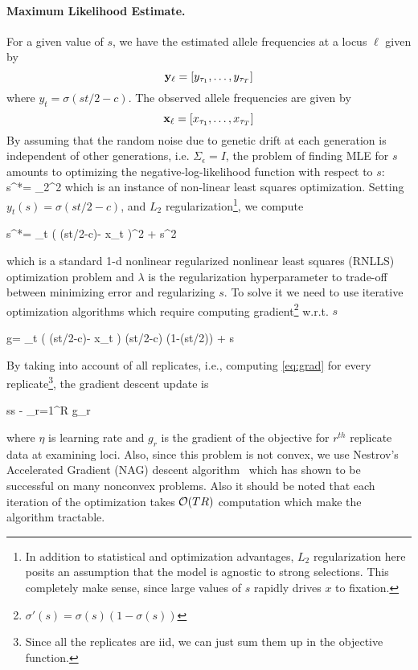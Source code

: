 \paragraph{Maximum Likelihood Estimate.}
For a given value of $s$, we have the estimated allele frequencies at
a locus $\ell$ given by
\[
{\bf y_{\ell}} = [y_{\tau_1},\ldots,y_{\tau_T}]
\]
where $y_t=\sigma(st/2-c)$. The observed allele frequencies are
given by
\[
{\bf x_{\ell}} = [x_{\tau_1},\ldots,x_{\tau_T}]
\]
By assuming that the random noise due to genetic drift at each generation is independent of other generations, i.e. $\Sigma_\epsilon = I$, the problem of finding MLE for $s$ amounts to optimizing the negative-log-likelihood function with respect to $s$:
\beq \label{eq:nlls0}
s^*=   \parallel_2^2
\eeq
which is an instance of non-linear least squares optimization.
Setting $y_t(s)=\sigma(st/2-c)$, and $L_2$ regularization\footnote{In addition to statistical and optimization advantages, $L_2$ regularization here posits an assumption that the model is agnostic to strong selections. This completely make sense, since large values of $s$ rapidly drives $x$ to fixation.}, we compute

\beq
s^*=  \sum_{t\in \Tc} \left( \sigma(st/2-c)- x_{t} \right)^2 + s^2
\eeq

which is a standard 1-d nonlinear regularized nonlinear least squares
(RNLLS) optimization problem and $\lambda$ is the regularization hyperparameter to trade-off between minimizing error and regularizing $s$. To solve it we need to use iterative
optimization algorithms which require computing
gradient\footnote{$\sigma'(s)=\sigma(s)(1-\sigma(s))$} w.r.t. $s$

\beq \label{eq:grad}
g=  \sum_{t\in \Tc}  ( \sigma(st/2-c)- x_{t} ) \sigma(st/2-c) (1-\sigma(st/2)) + \lambda s
\eeq

By taking into account of all replicates, i.e., computing
\ref{eq:grad} for every replicate\footnote{Since all the replicates
  are iid, we can just sum them up in the objective function.}, the
gradient descent update is

\beq
s\leftarrow s - \eta \sum_{r=1}^R g_r
\eeq

where $\eta$ is learning rate and $g_r$ is the gradient of the
objective for $r^{th}$ replicate data at examining loci. Also, since
this problem is not convex, we use Nestrov's Accelerated Gradient
(NAG) descent algorithm~\cite{XXX} which has shown to be successful on
many nonconvex problems. Also it should be noted that each iteration
of the optimization takes ${\cal O}(TR)$ computation which make the
algorithm tractable.

